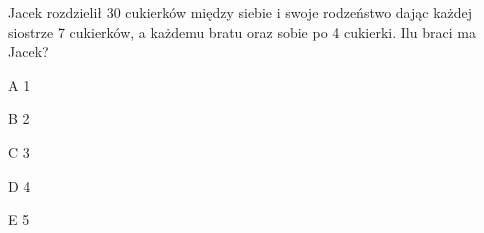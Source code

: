 \begin{tresc}
Jacek rozdzielił 30 cukierków między siebie i swoje rodzeństwo dając każdej siostrze 7 cukierków, a każdemu bratu oraz sobie po 4 cukierki. Ilu braci ma Jacek?
\end{tresc}
\begin{wariant}{A} 1 \end{wariant}
\begin{wariant}{B} 2 \end{wariant}
\begin{wariant}{C} 3 \end{wariant}
\begin{wariant}{D} 4 \end{wariant}
\begin{wariant}{E} 5 \end{wariant}
